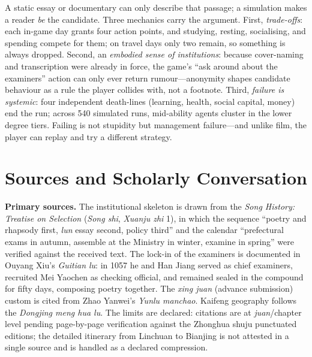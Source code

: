 \documentclass[12pt,a4paper]{article}
\begin{document}
A static essay or documentary can only describe that passage; a simulation
makes a reader \emph{be} the candidate. Three mechanics carry the argument.
First, \emph{trade-offs}: each in-game day grants four action points, and
studying, resting, socialising, and spending compete for them; on travel
days only two remain, so something is always dropped. Second, an
\emph{embodied sense of institutions}: because cover-naming and transcription
were already in force,\autocite[juan 155]{songshi} the game's ``ask around
about the examiners'' action can only ever return rumour---anonymity shapes
candidate behaviour as a rule the player collides with, not a footnote. Third,
\emph{failure is systemic}: four independent death-lines (learning, health,
social capital, money) end the run; across 540 simulated runs, mid-ability
agents cluster in the lower degree tiers. Failing is not stupidity but
management failure---and unlike film, the player can replay and try a
different strategy.

\section{Sources and Scholarly Conversation}

\textbf{Primary sources.} The institutional skeleton is drawn from the
\emph{Song History: Treatise on Selection} (\emph{Song shi}, \emph{Xuanju
zhi} 1), in which the sequence ``poetry and rhapsody first, \emph{lun} essay
second, policy third'' and the calendar ``prefectural exams in autumn,
assemble at the Ministry in winter, examine in spring'' were verified against
the received text.\autocite[juan 155]{songshi} The lock-in of the examiners is
documented in Ouyang Xiu's \emph{Guitian lu}: in 1057 he and Han Jiang served
as chief examiners, recruited Mei Yaochen as checking official, and remained
sealed in the compound for fifty days, composing poetry together.\autocite{guitianlu}
The \emph{xing juan} (advance submission) custom is cited from Zhao Yanwei's
\emph{Yunlu manchao}.\autocite[juan 8]{yunlu} Kaifeng geography follows the
\emph{Dongjing meng hua lu}.\autocite{dongjingmenghualu} The limits are
declared: citations are at \emph{juan}/chapter level pending page-by-page
verification against the Zhonghua shuju punctuated editions; the detailed
itinerary from Linchuan to Bianjing is not attested in a single source and is
handled as a declared compression.
\end{document}
